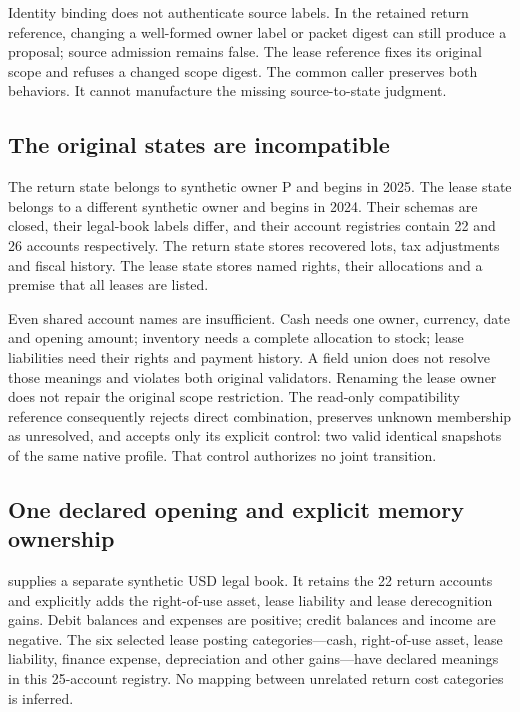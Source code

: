 Identity binding does not authenticate source labels. In the retained return
reference, changing a well-formed owner label or packet digest can still produce
a proposal; source admission remains false. The lease reference fixes its
original scope and refuses a changed scope digest. The common caller preserves
both behaviors. It cannot manufacture the missing source-to-state judgment.

\subsection{The original states are incompatible}

The return state belongs to synthetic owner P and begins in 2025. The lease
state belongs to a different synthetic owner and begins in 2024. Their schemas
are closed, their legal-book labels differ, and their account registries contain
22 and 26 accounts respectively. The return state stores recovered lots, tax
adjustments and fiscal history. The lease state stores named rights, their
allocations and a premise that all leases are listed.

Even shared account names are insufficient. Cash needs one owner, currency,
date and opening amount; inventory needs a complete allocation to stock; lease
liabilities need their rights and payment history. A field union does not
resolve those meanings and violates both original validators. Renaming the
lease owner does not repair the original scope restriction. The read-only
compatibility reference consequently rejects direct combination, preserves
unknown membership as unresolved, and accepts only its explicit control:
two valid identical snapshots of the same native profile. That control authorizes
no joint transition.

\subsection{One declared opening and explicit memory ownership}

 supplies a separate synthetic USD legal book.
It retains the 22 return accounts and explicitly adds the right-of-use asset,
lease liability and lease derecognition gains. Debit balances and expenses are
positive; credit balances and income are negative. The six selected lease
posting categories---cash, right-of-use asset, lease liability, finance expense,
depreciation and other gains---have declared meanings in this 25-account
registry. No mapping between unrelated return cost categories is inferred.


